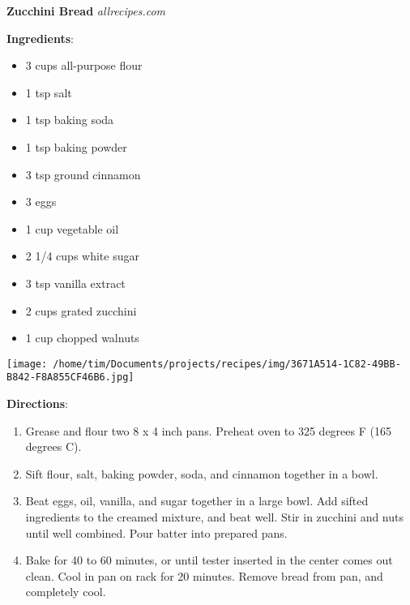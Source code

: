 \documentclass[11pt, twoside, openany]{book}
\begin{document}
\noindent\begin{minipage}[t]{\linewidth}%
{\Large\textbf{Zucchini Bread}} \label{zucchini-bread}\hfill\textit{allrecipes.com}\\
\noindent\begin{minipage}[t]{0.78\linewidth}%
\textbf{Ingredients}:\vspace{-3mm}
\begin{multicols}{2}
\begin{itemize}\setlength\itemsep{-1mm}
\item 3 cups all-purpose flour
\item 1 tsp salt
\item 1 tsp baking soda
\item 1 tsp baking powder
\item 3 tsp ground cinnamon
\item 3 eggs
\item 1 cup vegetable oil
\item 2 1/4 cups white sugar
\item 3 tsp vanilla extract
\item 2 cups grated zucchini
\item 1 cup chopped walnuts
\end{itemize}
\end{multicols}
\end{minipage}
\noindent\begin{minipage}[t]{0.18\linewidth}
\centering \strut\vspace*{-\baselineskip}\newline
\texttt{[image: /home/tim/Documents/projects/recipes/img/3671A514-1C82-49BB-B842-F8A855CF46B6.jpg]}\\
\end{minipage}\vspace{3mm}
\textbf{Directions}:
\vspace{-3mm}\begin{enumerate}\setlength\itemsep{-1mm}
\item Grease and flour two 8 x 4 inch pans. Preheat oven to 325 degrees F (165 degrees C).
\item Sift flour, salt, baking powder, soda, and cinnamon together in a bowl.
\item Beat eggs, oil, vanilla, and sugar together in a large bowl. Add sifted ingredients to the creamed mixture, and beat well. Stir in zucchini and nuts until well combined. Pour batter into prepared pans.
\item Bake for 40 to 60 minutes, or until tester inserted in the center comes out clean. Cool in pan on rack for 20 minutes. Remove bread from pan, and completely cool.
\end{enumerate}
\end{minipage}\vspace{8mm}
\end{document}
